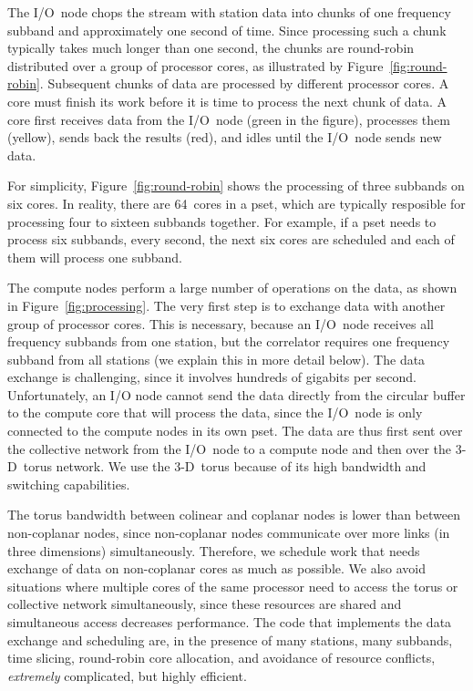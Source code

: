\documentclass[conference]{IEEEtran}
\begin{document}
The I/O~node chops the stream with station data into chunks of one frequency
subband and approximately one second of time.
Since processing such a chunk typically takes much longer than one second,
the chunks are round-robin distributed over a group of processor cores,
as illustrated by Figure~\ref{fig:round-robin}.
Subsequent chunks of data are processed by different processor cores.
A core must finish its work before it is time to process the next chunk of data.
A core first receives data from the I/O~node (green in the figure),
processes them (yellow), sends back the results (red), and idles until the
I/O~node sends new data.

For simplicity, Figure~\ref{fig:round-robin} shows the processing of
three subbands on six cores.  In reality, there are 64~cores in a
pset, which are typically resposible for processing four to sixteen
subbands together.  For example, if a pset needs to process six
subbands, every second, the next six cores are scheduled and each of
them will process one subband.

The compute nodes perform a large number of operations on the data, as shown in
Figure~\ref{fig:processing}.
The very first step is to exchange data with another group of processor cores.
This is necessary, because an I/O~node receives all frequency subbands from one
station, but the correlator requires one frequency subband from all
stations (we explain this in more detail below).
The data exchange is challenging, since it involves hundreds of gigabits per
second.
Unfortunately, an I/O node cannot send the data directly from the circular
buffer to the compute core that will process the data, since the I/O~node is
only connected to the compute nodes in its own pset.
The data are thus first sent over the collective network from the I/O~node to
a compute node and then over the 3-D~torus network.
We use the 3-D~torus because of its high bandwidth and switching capabilities.

The torus bandwidth between colinear and coplanar nodes is lower than between
non-coplanar nodes, since non-coplanar nodes communicate over more links
(in three dimensions) simultaneously.
Therefore, we schedule work that needs exchange of data 
on non-coplanar cores as much as possible.
We also avoid situations where multiple cores of the same processor need to
access the torus or collective network simultaneously, since these resources
are shared and simultaneous access decreases performance.
The code that implements the data exchange and scheduling are, in the presence
of many stations, many subbands, time slicing, round-robin core allocation,
and avoidance of resource conflicts, \emph{extremely\/} complicated, but
highly efficient.
\end{document}
